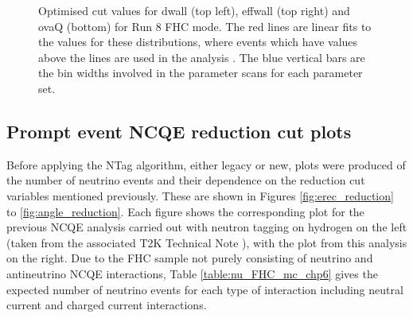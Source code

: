 \begin{figure}
\begin{minipage}{.5\linewidth}
    \end{minipage}\par\medskip
    \centering
    
    \caption[Optimised cut values for dwall (top left), effwall (top right) and ovaQ (bottom) for Run 8 FHC mode.]{Optimised cut values for dwall (top left), effwall (top right) and ovaQ (bottom) for Run 8 FHC mode. The red lines are linear fits to the values for these distributions, where events which have values above the lines are used in the analysis \cite{Abe_2019}. The blue vertical bars are the bin widths involved in the parameter scans for each parameter set.}
    \label{fig:optimised_dwall_effwall_ovaq}
\end{figure}
    


\subsection{Prompt event NCQE reduction cut plots}

Before applying the NTag algorithm, either legacy or new, plots were produced of the number of neutrino events and their dependence on the reduction cut variables mentioned previously. These are shown in Figures \ref{fig:erec_reduction} to \ref{fig:angle_reduction}. Each figure shows the corresponding plot for the previous NCQE analysis carried out with neutron tagging on hydrogen on the left (taken from the associated T2K Technical Note \cite{tn415_fiacob}), with the plot from this analysis on the right. Due to the FHC sample not purely consisting of neutrino and antineutrino NCQE interactions, Table \ref{table:nu_FHC_mc_chp6} gives the expected number of neutrino events for each type of interaction including neutral current and charged current interactions.

